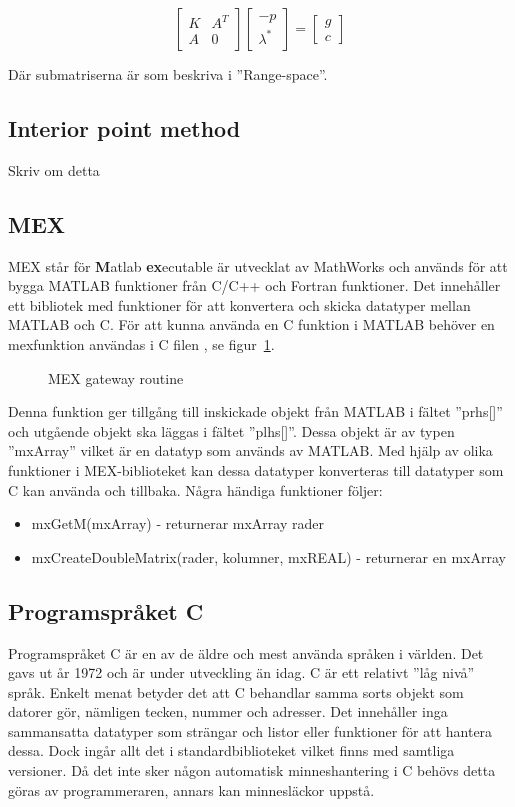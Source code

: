$$\begin{bmatrix}
K & A^T \\
A & 0
\end{bmatrix}
\begin{bmatrix}
-p \\
\lambda^*
\end{bmatrix}
=
\begin{bmatrix}
g \\
c
\end{bmatrix}
$$

Där submatriserna är som beskriva i ''Range-space''\citep{numericaloptimization}.

\subsection{Interior point method}
Skriv om detta

\subsection{MEX}
MEX står för \textbf{M}atlab \textbf{ex}ecutable är utvecklat av MathWorks och används för att bygga MATLAB funktioner från C/C++ och Fortran funktioner. Det innehåller ett bibliotek med funktioner för att konvertera och skicka datatyper mellan MATLAB och C. För att kunna använda en C funktion i MATLAB behöver en mexfunktion användas i C filen \citep{mathworks}, se figur~\ref{fig:mex}. 

\begin{figure}[H]

\caption{MEX gateway routine}
\label{fig:mex}
\end{figure}  

Denna funktion ger tillgång till inskickade objekt från MATLAB i fältet ''prhs[]'' och utgående objekt ska läggas i fältet ''plhs[]''. Dessa objekt är av typen ''mxArray'' vilket är en datatyp som används av MATLAB. Med hjälp av olika funktioner i MEX-biblioteket kan dessa datatyper konverteras till datatyper som C kan använda och tillbaka\citep{mathworks}. Några händiga funktioner följer:
\begin{itemize}
\item mxGetM(mxArray) - returnerar mxArray rader
\item mxCreateDoubleMatrix(rader, kolumner, mxREAL) - returnerar en mxArray
\end{itemize}

\subsection{Programspråket C}
Programspråket C är en av de äldre och mest använda språken i världen. Det gavs ut år 1972 och är under utveckling än idag. C är ett relativt ''låg nivå'' språk. Enkelt menat betyder det att C behandlar samma sorts objekt som datorer gör, nämligen tecken, nummer och adresser. Det innehåller inga sammansatta datatyper som strängar och listor eller funktioner för att hantera dessa. Dock ingår allt det i standardbiblioteket vilket finns med samtliga versioner. Då det inte sker någon automatisk minneshantering i C behövs detta göras av programmeraren, annars kan minnesläckor uppstå. \citep{cbible}
